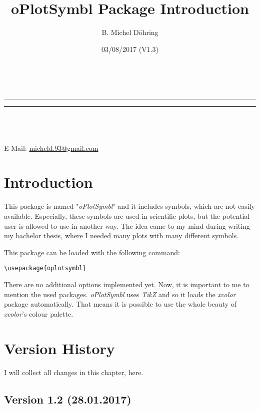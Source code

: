 \documentclass[
	a4paper,
	parskip=half,
    pagesize=auto,      		%
    listof=totoc,   		%
    bibliography=totoc,
	11pt
]{scrartcl}
\makeatletter
\newcommand{\linia}{\rule{\linewidth}{0.5pt} \rule{\linewidth}{0.5pt}}
\renewcommand{\maketitle}{
\begin{center}
\vspace{2ex}
{\huge \textsc{\@title}}
\vspace{1ex}
\\
\linia\\
\huge{\@date}\\
\vspace{5ex}
\@author\\ 
E-Mail: \href{mailto:micheld.93@ gmail.com}{micheld.93@gmail.com}\\
\vspace{10ex}
\end{center}
}
\makeatother
\begin{document}
\title{{\color[HTML]{FF0000} oPlotSymbl Package Introduction}}

\author{B. Michel Döhring}

\date{03/08/2017 (V1.3)}

\maketitle

\begin{multicols}{2}
\tableofcontents
\end{multicols}

\onehalfspacing 




\section{Introduction}

This package is named "\textit{oPlotSymbl}" and it includes symbols, which are not easily available. Especially, these symbols are used in scientific plots, but the potential user is allowed to use in another way. The idea came to my mind during writing my bachelor thesis, where I needed many plots with many different symbols. 

This package can be loaded with the following command: 

\begin{lstlisting}
\usepackage{oplotsymbl}	
\end{lstlisting}

There are no additional options implemented yet. Now, it is important to me to mention the used packages. \textit{oPlotSymbl} uses \textit{TikZ} \cite{tikz} and so it loads the \textit{xcolor} package automatically. That means it is possible to use the whole beauty of \textit{xcolor}'s \cite{xcolor} colour palette.

\section{Version History}

I will collect all changes in this chapter, here. 

\subsection{Version 1.2 (28.01.2017)}
\end{document}
